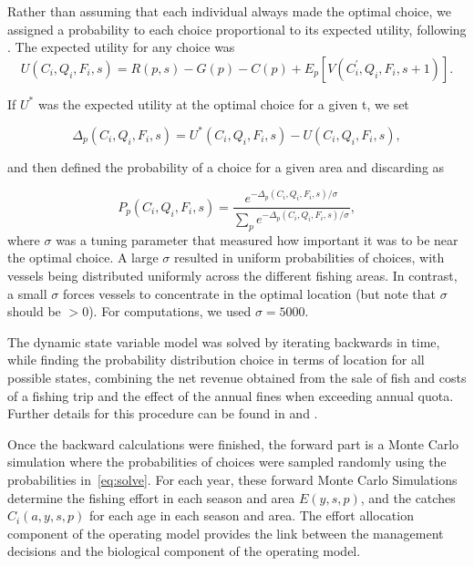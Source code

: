 \documentclass[12pt,oneline,a4paper,numbib]{ouparticle}
\numberwithin{equation}{subsection} %
\begin{document}
Rather than assuming that each individual always made the optimal choice, we assigned a probability to each choice proportional to its expected utility, following \cite{Dowling2011}. The expected utility for any choice was
\begin{equation}
U (C_i, Q_i, F_i, s) = R(p, s)- G(p) - C(p) + E_{p}[V (C_i^\prime, Q_i, F_i, s+1)].
\end{equation}

If $U^*$ was the expected utility at the optimal choice for a given t, we set

\begin{equation}
\Delta_{p}(C_i, Q_i, F_i, s) =  U^* (C_i, Q_i, F_i, s) - U (C_i, Q_i, F_i, s),
\end{equation}

and then defined the probability of a choice for a given area and discarding as	

\begin{equation} \label{eq:solve}
P_{p}(C_i, Q_i, F_i, s) = \frac
                {e^{ -\Delta_{p}(C_i, Q_i, F_i, s)/\sigma}}
                {\sum_p e^{ -\Delta_{p}(C_i, Q_i, F_i, s)/\sigma}},
\end{equation}
where $\sigma$ was a tuning parameter that measured how important it was to be near the optimal choice. A large $\sigma$ resulted in uniform probabilities of choices, with vessels being distributed uniformly across the different fishing areas. In contrast, a small $\sigma$ forces vessels to concentrate in the optimal location (but note that $\sigma$ should be $> 0$). For computations, we used $\sigma = 5000$. %

The dynamic state variable model was solved by iterating backwards in time, while finding the probability distribution choice in terms of location for all possible states, combining the net revenue obtained from the sale of fish and costs of a fishing trip and the effect of the annual fines when exceeding annual quota. Further details for this procedure can be found in \cite{Alzorriz2018, Batsleer2016} and \cite{Dowling2011}.

Once the backward calculations were finished, the forward part is a Monte Carlo simulation where the probabilities of choices were sampled randomly using the probabilities in~\ref{eq:solve}. For each year, these forward Monte Carlo Simulations determine the fishing effort in each season and area $E(y,s,p)$, and the catches $C_i (a, y, s, p)$ for each age in each season and area. The effort allocation component of the operating model provides the link between the management decisions and the biological component of the operating model.
\end{document}
